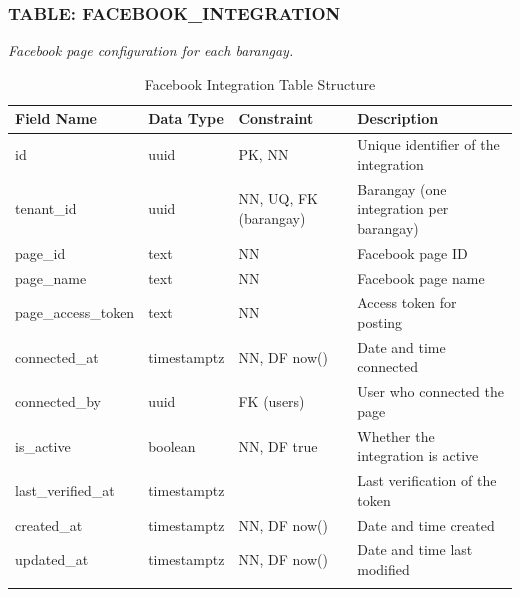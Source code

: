 \subsubsection*{TABLE: FACEBOOK\_INTEGRATION}
\noindent\textit{Facebook page configuration for each barangay.}
\begin{longtable}{|p{3.2cm}|p{2.2cm}|p{3.2cm}|p{5.4cm}|}
\hline
\textbf{Field Name} & \textbf{Data Type} & \textbf{Constraint} & \textbf{Description} \\ \hline
\endhead
\hline \endfoot
\hline \endlastfoot
id & uuid & PK, NN & Unique identifier of the integration \\ \hline
tenant\_id & uuid & NN, UQ, FK (barangay) & Barangay (one integration per barangay) \\ \hline
page\_id & text & NN & Facebook page ID \\ \hline
page\_name & text & NN & Facebook page name \\ \hline
page\_access\_token & text & NN & Access token for posting \\ \hline
connected\_at & timestamptz & NN, DF now() & Date and time connected \\ \hline
connected\_by & uuid & FK (users) & User who connected the page \\ \hline
is\_active & boolean & NN, DF true & Whether the integration is active \\ \hline
last\_verified\_at & timestamptz & & Last verification of the token \\ \hline
created\_at & timestamptz & NN, DF now() & Date and time created \\ \hline
updated\_at & timestamptz & NN, DF now() & Date and time last modified \\ \hline
\caption{Facebook Integration Table Structure}
\label{tab:facebook_integration}
\end{longtable}
\vspace{3mm}

